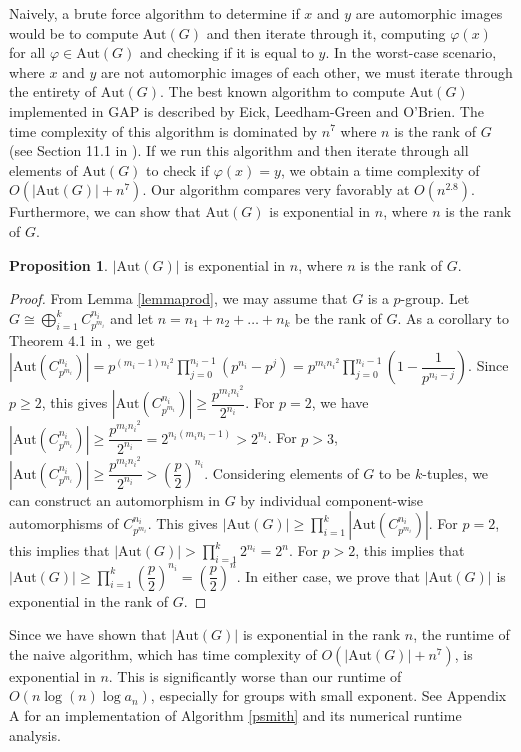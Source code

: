 \documentclass[11pt]{amsart}
\theoremstyle{definition}
\newtheorem{prop}[lem]{Proposition}
\renewcommand{\phi}{\varphi}
\newcommand{\Aut}{\text{Aut}}
\renewcommand{\geq}{\geqslant}
\numberwithin{equation}{section}
\begin{document}
Naively, a brute force algorithm to determine if $x$ and $y$ are automorphic images would be to compute $\Aut(G)$ and then iterate through it, computing $\phi(x)$ for all $\phi \in \Aut(G)$ and checking if it is equal to $y$. In the worst-case scenario, where $x$ and $y$ are not automorphic images of each other, we must iterate through the entirety of $\Aut(G)$.
The best known algorithm to compute $\Aut(G)$ implemented in GAP is described by 
Eick, Leedham-Green and O'Brien. The time complexity of this algorithm is dominated by $n^7$ where $n$ is the rank of $G$ (see Section 11.1 in \cite{eick}). If we run this algorithm and then iterate through all elements of $\Aut(G)$ to check if $\phi(x) = y$, we obtain a time complexity of $O(|\Aut(G)| + n^7)$. 
Our algorithm compares very favorably at $O(n^{2.8})$.
Furthermore, we can show that $\Aut(G)$ is exponential in $n$, where $n$ is the rank of $G$. 
\begin{prop}\label{lem:sizeautg}
    $|\Aut(G)|$ is exponential in $n$, where $n$ is the rank of $G$. 
\end{prop}
\begin{proof}
From Lemma \ref{lemmaprod}, we may assume that $G$ is a $p$-group.
Let $G \cong \bigoplus_{i=1}^k  C_{p^{m_i}}^{n_i}$ and let $n=n_1+n_2+\dots+n_k$ be the rank of $G$.
As a corollary to Theorem 4.1 in \cite{hillar}, we get $|\Aut(C_{p^{m_i}}^{n_i})| = {p^{(m_i-1){n_i}^2}}\prod\limits_{j=0}^{n_i-1}(p^{n_i}-p^j)  = p^{{m_i}{n_i}^2}\prod\limits_{j=0}^{n_i-1}\left(1-\dfrac{1}{p^{n_i-j}}\right)$. 
Since $p \geq 2$, this gives $|\Aut(C_{p^{m_i}}^{n_i})| \geq \dfrac{p^{{m_i}{n_i}^2}}{2^{n_i}}$.
For $p=2$, we have
$|\Aut(C_{p^{m_i}}^{n_i})| \geq \dfrac{p^{{m_i}{n_i}^2}}{2^{n_i}} = 2^{n_i(m_in_i-1)} > 2^{n_i}$.
For $p > 3$, $|\Aut(C_{p^{m_i}}^{n_i})| \geq \dfrac{p^{{m_i}{n_i}^2}}{2^{n_i}} > \left( \dfrac{p}{2}\right)^{n_i} $. 
Considering elements of $G$ to be $k$-tuples, we can construct an automorphism in $G$ by individual component-wise automorphisms of $C_{p^{m_i}}^{n_i} $.
This gives $|\Aut(G)| \geq \prod\limits_{i=1}^k  |\Aut(C_{p^{m_i}}^{n_i})|$.
For $p=2$, this implies that $|\Aut(G)| >  \prod\limits_{i=1}^k  2^{n_i} = 2^n$. For $p > 2$, this implies that 
$|\Aut(G)| \geq  \prod\limits_{i=1}^k  \left( \dfrac{p}{2}\right)^{n_i}  =  \left( \dfrac{p}{2}\right)^n$. 
In either case, we prove that $|\Aut(G)|$ is exponential in the rank of $G$.
\end{proof}
Since we have shown that $|\Aut(G)|$ is exponential in the rank $n$, the runtime of the naive algorithm, which has time complexity of  $O(|\Aut(G)| + n^7)$, is 
 exponential in $n$. This is significantly worse than our runtime of $O(n\log (n) \log a_n)$, especially for groups with small exponent. See Appendix A for an implementation of Algorithm \ref{psmith} and its numerical runtime analysis. 
\end{document}
